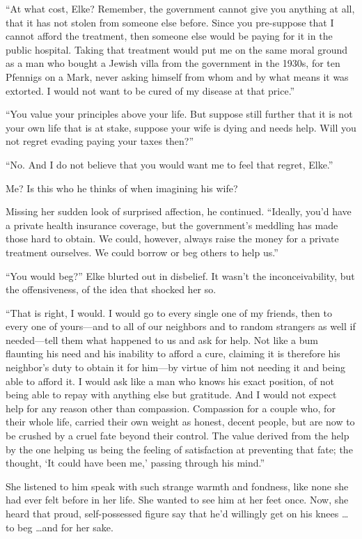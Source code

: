 ``At what cost, Elke? Remember, the government cannot give you anything at all, that it has not stolen from someone else before. Since you pre-suppose that I cannot afford the treatment, then someone else would be paying for it in the public hospital. Taking that treatment would put me on the same moral ground as a man who bought a Jewish villa from the government in the 1930s, for ten Pfennigs on a Mark, never asking himself from whom and by what means it was extorted. I would not want to be cured of my disease at that price.''

``You value your principles above your life. But suppose still further that it is not your own life that is at stake, suppose your wife is dying and needs help. Will you not regret evading paying your taxes then?''

``No. And I do not believe that you would want me to feel that regret, Elke.''

Me? Is this who he thinks of when imagining his wife?

Missing her sudden look of surprised affection, he continued. ``Ideally, you'd have a private health insurance coverage, but the government's meddling has made those hard to obtain. We could, however, always raise the money for a private treatment ourselves. We could borrow or beg others to help us.''

``You would beg?'' Elke blurted out in disbelief. It wasn't the inconceivability, but the offensiveness, of the idea that shocked her so.

``That is right, I would. I would go to every single one of my friends, then to every one of yours---and to all of our neighbors and to random strangers as well if needed---tell them what happened to us and ask for help. Not like a bum flaunting his need and his inability to afford a cure, claiming it is therefore his neighbor's duty to obtain it for him---by virtue of him not needing it and being able to afford it. I would ask like a man who knows his exact position, of not being able to repay with anything else but gratitude. And I would not expect help for any reason other than compassion. Compassion for a couple who, for their whole life, carried their own weight as honest, decent people, but are now to be crushed by a cruel fate beyond their control. The value derived from the help by the one helping us being the feeling of satisfaction at preventing that fate; the thought, `It could have been me,' passing through his mind.''

She listened to him speak with such strange warmth and fondness, like none she had ever felt before in her life. She wanted to see him at her feet once. Now, she heard that proud, self-possessed figure say that he'd willingly get on his knees \ldots to beg \ldots and for her sake.


